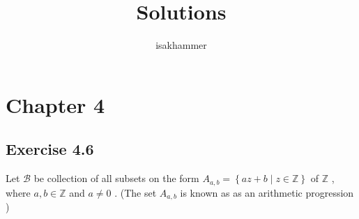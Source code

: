 \documentclass{article}
\title{Solutions}
\author{isakhammer }
\theoremstyle{remark}
\begin{document}
\maketitle
\tableofcontents
\newpage

\newpage
\section{Chapter 4}%
\label{sec:chapter_4}


\subsection{Exercise 4.6}%
\label{sub:exercise_4_6}

Let $\mathscr{B} $ be collection of all subsets on the form $A_{a,b} = \left\{ az + b  \mid  z \in \mathbb{Z}  \right\}$
of $\mathbb{Z} $ , where $a,b \in \mathbb{Z}  $ and $ a \neq 0 $ . (The set $A_{a,b}$ is known as as an arithmetic
progression )
\end{document}
